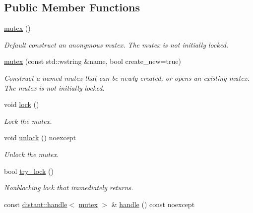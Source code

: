 \subsection*{Public Member Functions}
\begin{DoxyCompactItemize}
\item 
\mbox{\hyperlink{classdistant_1_1synch_1_1mutex_aea8a33da8746aae1d78ebb970d80bc1a}{mutex}} ()
\begin{DoxyCompactList}\small\item\em Default construct an anonymous mutex. The mutex is not initially locked. \end{DoxyCompactList}\item 
\mbox{\hyperlink{classdistant_1_1synch_1_1mutex_aa6a362d74dfe7447353d2d237e52a5f7}{mutex}} (const std\+::wstring \&name, bool create\+\_\+new=true)
\begin{DoxyCompactList}\small\item\em Construct a named mutex that can be newly created, or opens an existing mutex. The mutex is not initially locked. \end{DoxyCompactList}\item 
void \mbox{\hyperlink{classdistant_1_1synch_1_1mutex_a1a37630c7ff5ae38d76f408a56ec4e92}{lock}} ()
\begin{DoxyCompactList}\small\item\em Lock the mutex. \end{DoxyCompactList}\item 
\mbox{\label{classdistant_1_1synch_1_1mutex_add8dd1b7088b9063c094bfc9b818db5e}} 
void \mbox{\hyperlink{classdistant_1_1synch_1_1mutex_add8dd1b7088b9063c094bfc9b818db5e}{unlock}} () noexcept
\begin{DoxyCompactList}\small\item\em Unlock the mutex. \end{DoxyCompactList}\item 
bool \mbox{\hyperlink{classdistant_1_1synch_1_1mutex_acea5e3450dfd9227185a55f558f4d024}{try\+\_\+lock}} ()
\begin{DoxyCompactList}\small\item\em Nonblocking lock that immediately returns. \end{DoxyCompactList}\item 
const \mbox{\hyperlink{classdistant_1_1handle}{distant\+::handle}}$<$ \mbox{\hyperlink{classdistant_1_1synch_1_1mutex}{mutex}} $>$ \& \mbox{\hyperlink{classdistant_1_1synch_1_1mutex_a8f590ad6a717569b87f4c4ab1b9d24c1}{handle}} () const noexcept

\end{DoxyCompactItemize}
